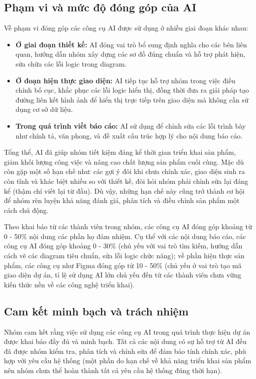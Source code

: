 \subsection{Phạm vi và mức độ đóng góp của AI}
Về phạm vi đóng góp các công cụ AI được sử dụng ở nhiều giai đoạn khác nhau:
\begin{itemize}
    \item \textbf{Ở giai đoạn thiết kế:} AI đóng vai trò bổ sung định nghĩa cho các bên liên quan, hướng dẫn nhóm xây dựng các sơ đồ đúng chuẩn và hỗ trợ phát hiện, sửa chữa các lỗi logic trong diagram.
    \item \textbf{Ở đoạn hiện thực giao diện:} AI tiếp tục hỗ trợ nhóm trong việc điều chỉnh bố cục, khắc phục các lỗi logic hiển thị, đồng thời đưa ra giải pháp tạo đường liên kết hình ảnh để hiển thị trực tiếp trên giao diện mà không cần sử dụng cơ sở dữ liệu. 
    \item \textbf{Trong quá trình viết báo cáo:} AI sử dụng để chỉnh sửa các lỗi trình bày như chính tả, văn phong, và đề xuất cấu trúc hợp lý cho nội dung báo cáo.
\end{itemize}

Tổng thể, AI đã giúp nhóm tiết kiệm đáng kể thời gian triển khai sản phẩm, giảm khối lượng công việc và nâng cao chất lượng sản phẩm cuối cùng. Mặc dù còn gặp một số hạn chế như: các gợi ý đôi khi chưa chính xác, giao diện sinh ra còn tĩnh và khác biệt nhiều so với thiết kế, đòi hỏi nhóm phải chỉnh sửa lại đáng kể (thậm chí viết lại từ đầu). Dù vậy, những hạn chế này cũng trở thành cơ hội để nhóm rèn luyện khả năng đánh giá, phân tích và điều chỉnh sản phẩm một cách chủ động.

Theo khai báo từ các thành viên trong nhóm, các công cụ AI đóng góp khoảng từ 0 - 50\% nội dung các phần họ đảm nhiệm. Cụ thể với các nội dung báo cáo, các công cụ AI đóng góp khoảng 0 - 30\% (chủ yếu với vai trò tìm kiếm, hướng dẫn cách vẽ các diagram tiêu chuẩn, sửa lỗi logic chức năng); về phần hiện thực sản phẩm, các công cụ như Figma đóng góp từ 10 - 50\% (chủ yếu ở vai trò tạo mã giao diện dự án, tỉ lệ sử dụng AI lớn chủ yếu đến từ các thành viên chưa vững kiến thức nền về các công nghệ triển khai).

\subsection{Cam kết minh bạch và trách nhiệm}

Nhóm cam kết rằng việc sử dụng các công cụ AI trong quá trình thực hiện dự án được khai báo đầy đủ và minh bạch. Tất cả các nội dung có sự hỗ trợ từ AI đều đã được nhóm kiểm tra, phân tích và chỉnh sửa để đảm bảo tính chính xác, phù hợp với yêu cầu hệ thống (một phần do hạn chế về khả năng triển khai sản phẩm nên nhóm chưa thể hoàn thành tất cả yêu cầu hệ thống đúng thời hạn).

